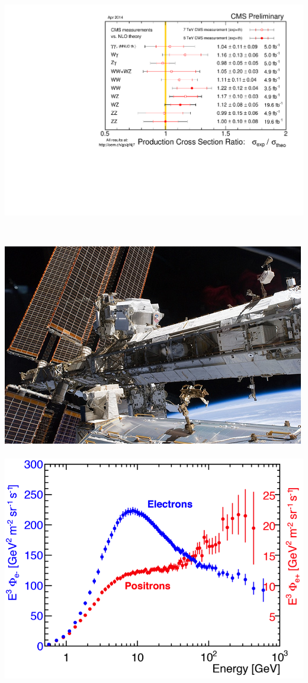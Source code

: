 \documentclass{beamer}
\begin{document}
\begin{frame}
\begin{minipage}[t]{0.80\paperwidth}
\begin{columns}
\begin{column}{0.50\linewidth}
         \begin{tcolorbox}[colback=UNL@Cream!5,colframe=UNL@Cream!60,title=\textcolor{UMN@Maroon}{\textbf{$ZZ$, $WW$ Production}}]     
            \mbox{\includegraphics[height=0.35\linewidth,width=\linewidth]{THESISPLOTS/New-Physics-PLOTS/SigmaR_v5.pdf}}            
         \end{tcolorbox}
      \end{column} 
  \end{columns}
\end{minipage}
\vspace{-0.1cm}
\begin{minipage}[b]{0.90\linewidth}
   \begin{tcolorbox}[colback=UNL@Cream!5,colframe=UNL@Cream!60,title=\textcolor{UMN@Maroon}{\textbf{AMS Experiment on ISS}}]
       \mbox{
            \includegraphics[height=0.20\linewidth,width=0.45\linewidth]{THESISPLOTS/New-Physics-PLOTS/AMS-ON-ISS.jpg} \quad \quad 
           \includegraphics[height=0.20\linewidth,width=0.45\linewidth]{THESISPLOTS/New-Physics-PLOTS/AMS-Electron-Positron-Flux-Difference.png} \quad
}
   \end{tcolorbox}

\end{minipage}
\end{frame}
\end{document}
